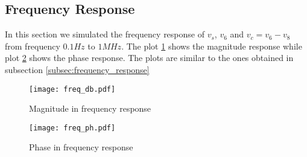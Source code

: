 \newpage
\subsection{Frequency Response}

\par In this section we simulated the frequency response of $v_s$, $v_6$ and $v_c=v_6-v_8$ from frequency $0.1 Hz$ to $1 MHz$. The plot \ref{fig:magnitude} shows the magnitude response while plot \ref{fig:phase} shows the phase response. The plots are similar to the ones obtained in subsection \ref{subsec:frequency_response}\par

\begin{figure}[H] \centering
\texttt{[image: freq\_db.pdf]}
\caption{Magnitude in frequency response}
\label{fig:magnitude}
\end{figure}

\begin{figure}[H] \centering
\texttt{[image: freq\_ph.pdf]}
\caption{Phase in frequency response}
\label{fig:phase}
\end{figure}




